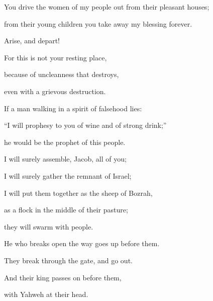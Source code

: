 {\par }{\Q {}You drive the women of my people out from their pleasant houses;
\par }{\QB from their young children you take away my blessing forever.
\par }{\Q {}Arise, and depart!
\par }{\QB For this is not your resting place,
\par }{\QB because of uncleanness that destroys,
\par }{\QB even with a grievous destruction.
\par }{\Q {}If a man walking in a spirit of falsehood lies:
\par }{\QB “I will prophesy to you of wine and of strong drink;”
\par }{\QB he would be the prophet of this people.
\par }{\Q {}I will surely assemble, Jacob, all of you;
\par }{\QB I will surely gather the remnant of Israel;
\par }{\Q I will put them together as the sheep of Bozrah,
\par }{\QB as a flock in the middle of their pasture;
\par }{\QB they will swarm with people.
\par }{\Q {}He who breaks open the way goes up before them.
\par }{\QB They break through the gate, and go out.
\par }{\QB And their king passes on before them,
\par }{\QB with Yahweh at their head.

}
